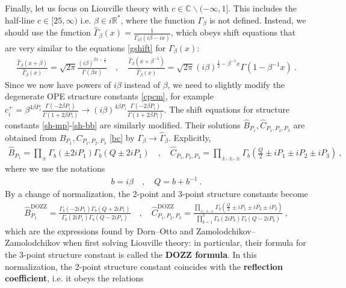 \documentclass[12pt, a4paper]{article}
\theoremstyle{break}
\begin{document}
Finally, let us focus on Liouville theory with $c\in \mathbb{C}\backslash (-\infty,1]$. This includes the half-line $c\in [25,\infty)$ i.e. $\beta\in i\mathbb{R}^*$, where the function $\Gamma_\beta$ is not defined.
Instead, we should use the function $\hat{\Gamma}_\beta(x) = \frac{1}{\Gamma_{i\beta}(i\beta -ix)}$, which obeys shift equations that are very similar to the equations \eqref{gshift} for $\Gamma_\beta(x)$: 
\begin{align}
 \frac{\hat\Gamma_\beta(x+\beta)}{\hat\Gamma_\beta(x)} = \sqrt{2\pi}\frac{(i\beta)^{\beta x-\frac12}}{\Gamma(\beta x)}
\quad , \quad 
\frac{\hat\Gamma_\beta(x+\beta^{-1})}{\hat\Gamma_\beta(x)} = \sqrt{2\pi}(i\beta)^{\frac12-\beta^{-1}x}\Gamma(1-\beta^{-1}x) \ .
\label{hgshift}
\end{align}
Since we now have powers of $i\beta$ instead of $\beta$, we need to slightly modify the degenerate OPE structure constants \eqref{cpcm}, for example $c_i^+ = \beta^{4\beta P_i}\frac{\Gamma(-2\beta P_i)}{\Gamma(1+2\beta P_i)} \to (i\beta)^{4\beta P_i}\frac{\Gamma(-2\beta P_i)}{\Gamma(1+2\beta P_i)}$. The shift equations for structure constants \eqref{sh-mp}-\eqref{sh-bb} are similarly modified. Their solutions $\hat B_{P_1},\hat C_{P_1,P_2,P_3}$ are obtained from $B_{P_1},C_{P_1,P_2,P_3}$ \eqref{bc} by $\Gamma_\beta \to \hat\Gamma_\beta$. Explicitly,
\begin{align}
 \boxed{\hat B_{P_1} = \prod_\pm \Gamma_b\left(\pm 2iP_1\right)\Gamma_b\left(Q\pm 2iP_1\right)} \quad , \quad 
 \boxed{\hat C_{P_1,P_2,P_3} = \prod_{\pm,\pm,\pm} \Gamma_b\left(\tfrac{Q}{2} \pm iP_1\pm iP_2\pm iP_3\right)}\ ,
 \label{bci}
\end{align}
where we use the notations 
\begin{align}
 b = i\beta \quad , \quad Q = b + b^{-1} \ . 
 \label{bQ}
\end{align}
By a change of normalization, the 2-point and 3-point structure constants become 
\begin{align}
 \hat B^\text{DOZZ}_{P_1} = \frac{\Gamma_b\left(- 2iP_1\right)\Gamma_b\left(Q+ 2iP_1\right)}{\Gamma_b\left( 2iP_1\right)\Gamma_b\left(Q- 2iP_1\right)} \quad , \quad 
 \hat C^\text{DOZZ}_{P_1,P_2,P_3} = \frac{\prod_{\pm,\pm,\pm} \Gamma_b\left(\tfrac{Q}{2} \pm iP_1\pm iP_2\pm iP_3\right)}{\prod_{k=1}^3 \Gamma_b(2iP_k)\Gamma_b(Q-2iP_k)}\ ,
 \label{dozz}
\end{align}
which are the expressions found by Dorn--Otto and Zamolodchikov--Zamolodchikov when first solving Liouville theory: in particular, their formula for the 3-point structure constant is called the \textbf{DOZZ formula}. In this normalization, the 2-point structure constant coincides with the \textbf{reflection coefficient}, i.e. it obeys the relations 
\end{document}
